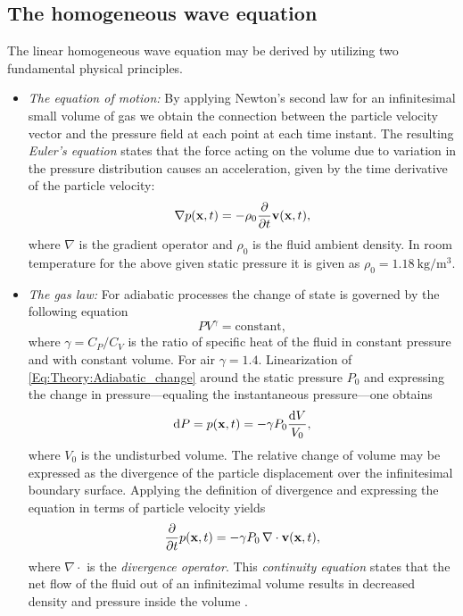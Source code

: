 \subsection{The homogeneous wave equation}
%
The linear homogeneous wave equation may be derived by utilizing two fundamental physical principles.
\begin{itemize}
\item \emph{The equation of motion:} By applying Newton's second law for an infinitesimal small volume of gas we obtain the connection between the particle velocity vector and the pressure field at each point at each time instant. 
The resulting \emph{Euler's equation} states that the force acting on the volume due to variation in the pressure distribution causes an acceleration, given by the time derivative of the particle velocity:
\begin{equation}
\nabla p(\mathbf{x},t) = -\rho_0 \frac{\partial}{\partial t} \mathbf{v}(\mathbf{x},t),
\label{Eq:Theory:Eulers_equation}
\end{equation}
where $\nabla$ is the gradient operator and $\rho_0$ is the fluid ambient density. 
In room temperature for the above given static pressure it is given as $\rho_0 = 1.18~\mathrm{kg}/\mathrm{m}^3$.

\item \emph{The gas law:} For adiabatic processes the change of state is governed by the following equation
\begin{equation}
P V^{\gamma} = \mathrm{constant},
\label{Eq:Theory:Adiabatic_change}
\end{equation}
where $\gamma = C_P/C_V$ is the ratio of specific heat of the fluid in constant pressure and with constant volume. For air $\gamma = 1.4$. 
Linearization of \eqref{Eq:Theory:Adiabatic_change} around the static pressure $P_0$ and expressing the change in pressure---equaling the instantaneous pressure---one obtains
\begin{equation}
\mathrm{d} P = p(\mathbf{x},t) = -\gamma P_0 \frac{\mathrm{d} V}{V_0},
\end{equation}
where $V_0$ is the undisturbed volume. 
The relative change of volume may be expressed as the divergence of the particle displacement over the infinitesimal boundary surface. 
Applying the definition of divergence and expressing the equation in terms of particle velocity yields
\begin{equation}
\frac{\partial}{\partial t} p(\mathbf{x},t) = -\gamma P_0 \, \nabla \cdot \mathbf{v}(\mathbf{x},t),
\label{Eq:Theory:continuity_eq}
\end{equation}
where $\nabla \cdot$ is the \emph{divergence operator}.
This \emph{continuity equation} states that the net flow of the fluid out of an infinitezimal volume results in decreased density and pressure inside the volume \cite{Arfken2005}.
\end{itemize}
